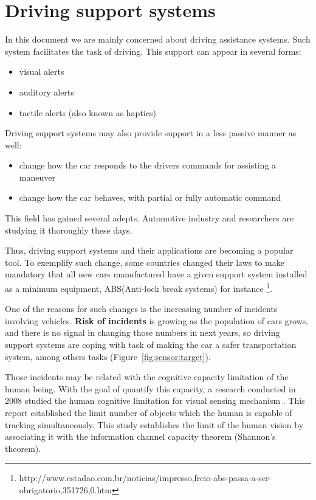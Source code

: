 \section{Driving support systems}

In this document we are mainly concerned about driving assistance systems. Such system facilitates the task of driving. This support can appear in several forms: 

\begin{itemize}
\item visual alerts
\item auditory alerts
\item tactile alerts (also known as haptics\cite{riener2010sensor})
\end{itemize}

Driving support systems may also provide support in a less passive manner as well:

\begin{itemize}
\item change how the car responds to the drivers commands for assisting a maneuver
\item change how the car behaves, with partial or fully automatic command
\end{itemize}

This field has gained several adepts. Automotive industry and researchers are studying it thoroughly these days.

Thus, driving support systems and their applications are becoming a popular tool. To exemplify such change, some countries changed their laws to make mandatory that all new cars manufactured have a given support system installed as a minimum equipment, ABS(Anti-lock break systems)  for instance \footnote{http://www.estadao.com.br/noticias/impresso,freio-abs-passa-a-ser-obrigatorio,351726,0.htm}.

One of the reasons for such changes is the increasing number of incidents involving vehicles. \textbf{Risk of incidents} is growing as the population of cars grows, and there is no signal in changing those numbers in next years, so driving support systems are coping with task of making the car a safer transportation system, among others tasks (Figure~\ref{fig:sensor:target}).

Those incidents may be related with the cognitive capacity limitation of the human being. With the goal of quantify this capacity, a research conducted in 2008 studied the human cognitive limitation for visual sensing mechanism \cite{LautarutisV}. This report established the limit number of objects which the human is capable of tracking simultaneously. This study establishes the limit of the human vision by associating it with the information channel capacity theorem (Shannon's theorem). 

